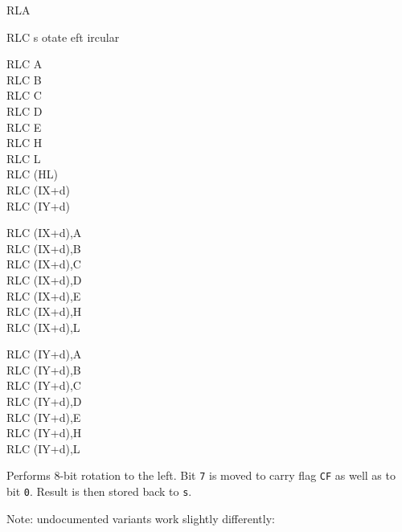 \begin{basedescript}{
	\desclabelstyle{\multilinelabel}
	\desclabelwidth{3cm}}
\begin{DetailItem}{RLA}
		\begin{DetailEffects}
			\FlagsRLA
		\end{DetailEffects}
						
		\begin{DetailTiming}
		\end{DetailTiming}

	\end{DetailItem}
	
	\begin{DetailItem}{RLC s}
		{otate eft ircular}
		{}

		\begin{DetailVariants}
			RLC A\\
			RLC B\\
			RLC C\\
			RLC D\\
			RLC E\\
			RLC H\\
			RLC L\\
			RLC (HL)\\
			RLC (IX+d)\\
			RLC (IY+d)

			\columnbreak
			RLC (IX+d),A\UNDOC\\
			RLC (IX+d),B\UNDOC\\
			RLC (IX+d),C\UNDOC\\
			RLC (IX+d),D\UNDOC\\
			RLC (IX+d),E\UNDOC\\
			RLC (IX+d),H\UNDOC\\
			RLC (IX+d),L\UNDOC

			\columnbreak
			RLC (IY+d),A\UNDOC\\
			RLC (IY+d),B\UNDOC\\
			RLC (IY+d),C\UNDOC\\
			RLC (IY+d),D\UNDOC\\
			RLC (IY+d),E\UNDOC\\
			RLC (IY+d),H\UNDOC\\
			RLC (IY+d),L\UNDOC
		\end{DetailVariants}

		Performs 8-bit rotation to the left. Bit {\tt 7} is moved to carry flag {\tt CF} as well as to bit {\tt 0}. Result is then stored back to {\tt s}.

		Note: undocumented variants work slightly differently:

		\begin{multicols}{2}


\end{multicols}
\end{DetailItem}
\end{basedescript}
